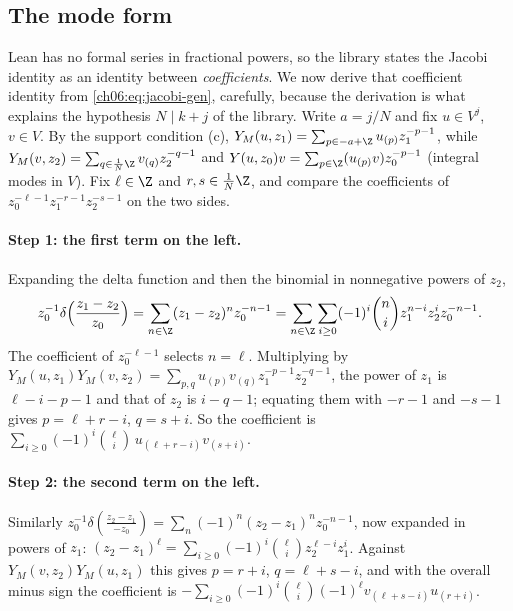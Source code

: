 \subsection{The mode form}

Lean has no formal series in fractional powers, so the library states the Jacobi identity as an
identity between \emph{coefficients}.  We now derive that coefficient identity from
\eqref{ch06:eq:jacobi-gen}, carefully, because the derivation is what explains the hypothesis
$N\mid k+j$ of the library.  Write $a=j/N$ and fix $u\in V^j$, $v\in V$.  By the support condition
(c), $Y_M(u,z_1)=\sum_{p\in-a+\Z}u_{(p)}z_1^{-p-1}$, while $Y_M(v,z_2)=\sum_{q\in\frac1N\Z}
v_{(q)}z_2^{-q-1}$ and $Y(u,z_0)v=\sum_{p\in\Z}(u_{(p)}v)z_0^{-p-1}$ (integral modes in $V$).
Fix $\ell\in\Z$ and $r,s\in\frac1N\Z$, and compare the coefficients of
$z_0^{-\ell-1}z_1^{-r-1}z_2^{-s-1}$ on the two sides.

\paragraph{Step 1: the first term on the left.}  Expanding the delta function and then the binomial
in nonnegative powers of $z_2$,
\begin{equation*}
  z_0^{-1}\delta\Bigl(\frac{z_1-z_2}{z_0}\Bigr)=\sum_{n\in\Z}(z_1-z_2)^nz_0^{-n-1}
  =\sum_{n\in\Z}\sum_{i\ge0}(-1)^i\binom ni z_1^{n-i}z_2^{i}z_0^{-n-1}.
\end{equation*}
The coefficient of $z_0^{-\ell-1}$ selects $n=\ell$.  Multiplying by
$Y_M(u,z_1)Y_M(v,z_2)=\sum_{p,q}u_{(p)}v_{(q)}z_1^{-p-1}z_2^{-q-1}$, the power of $z_1$ is
$\ell-i-p-1$ and that of $z_2$ is $i-q-1$; equating them with $-r-1$ and $-s-1$ gives $p=\ell+r-i$,
$q=s+i$.  So the coefficient is $\sum_{i\ge0}(-1)^i\binom\ell i\,u_{(\ell+r-i)}v_{(s+i)}$.

\paragraph{Step 2: the second term on the left.}  Similarly
$z_0^{-1}\delta(\frac{z_2-z_1}{-z_0})=\sum_n(-1)^n(z_2-z_1)^nz_0^{-n-1}$, now expanded in powers of
$z_1$: $(z_2-z_1)^\ell=\sum_{i\ge0}(-1)^i\binom\ell i z_2^{\ell-i}z_1^{i}$.  Against
$Y_M(v,z_2)Y_M(u,z_1)$ this gives $p=r+i$, $q=\ell+s-i$, and with the overall minus sign the
coefficient is $-\sum_{i\ge0}(-1)^i\binom\ell i(-1)^\ell v_{(\ell+s-i)}u_{(r+i)}$.


